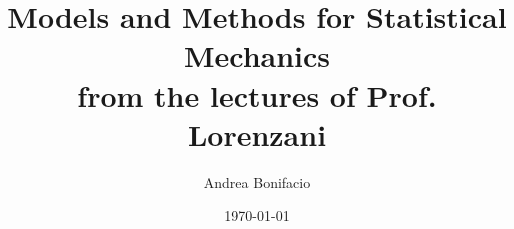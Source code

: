 \documentclass[a4paper,11pt]{article}
\theoremstyle{break}
\numberwithin{equation}{section}
\begin{document}
\title{Models and Methods for Statistical Mechanics \\
\small from the lectures of Prof. Lorenzani}
\author{Andrea Bonifacio}
\date{\today}
\maketitle


\end{document}
